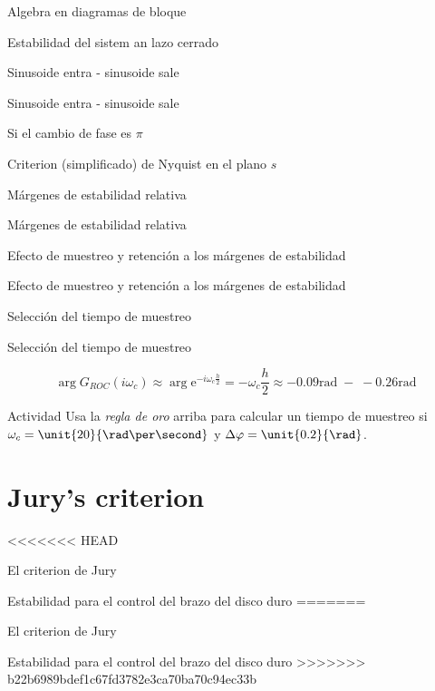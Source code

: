 \documentclass[presentation,aspectratio=169]{beamer}
\begin{document}
\begin{frame}[label={sec:org8e8e439}]{Algebra en diagramas de bloque}
\begin{frame}[label={sec:org5218f19}]{Estabilidad del sistem an lazo cerrado}
\begin{frame}[label={sec:org4ce2307}]{Sinusoide entra - sinusoide sale}
\begin{frame}[label={sec:orgc598966}]{Sinusoide entra - sinusoide sale}
\begin{frame}[label={sec:orgbd54147}]{Si el cambio de fase es \(\pi\)}
\begin{frame}[label={sec:orgf06388b}]{Criterion (simplificado) de Nyquist en el plano \(s\)}
\begin{frame}[label={sec:org5967884}]{Márgenes de estabilidad relativa}
\begin{frame}[label={sec:orgb5ba0e3}]{Márgenes de estabilidad relativa}
\begin{frame}[label={sec:orga8344a9}]{Efecto de muestreo y retención a los márgenes de estabilidad}
\begin{frame}[label={sec:org5e3653d}]{Efecto de muestreo y retención a los márgenes de estabilidad}
\begin{frame}[label={sec:orgd9a9d5d}]{Selección del tiempo de muestreo}
\begin{frame}[label={sec:org8934d24}]{Selección del tiempo de muestreo}
\begin{center}
\end{center}
\[ \arg G_{ROC}(i\omega_c) \approx \arg \mathrm{e}^{-i\omega_c \frac{h}{2}} = -\omega_c \frac{h}{2} \approx -0.09 \text{rad}\; - \; -0.26\text{rad} \]

\alert{Actividad} Usa la \emph{regla de oro} arriba para calcular un tiempo de muestreo si \(\omega_c = \unit{20}{\rad\per\second}\) y \(\Delta\varphi = \unit{0.2}{\rad}\).
\end{frame}

\section{Jury's criterion}
<<<<<<< HEAD
\label{sec:org6e2371e}

\begin{frame}[label={sec:orgf430da5}]{El criterion de Jury}
\end{frame}
\begin{frame}[label={sec:org2cdebfb}]{Estabilidad para el control del brazo del disco duro}
=======
\label{sec:org41b841e}

\begin{frame}[label={sec:orgb2709cb}]{El criterion de Jury}
\end{frame}
\begin{frame}[label={sec:org9fc0e64}]{Estabilidad para el control del brazo del disco duro}
>>>>>>> b22b6989bdef1c67fd3782e3ca70ba70c94ec33b
\begin{center}
\end{center}
\end{frame}
\end{frame}
\end{frame}
\end{frame}
\end{frame}
\end{frame}
\end{frame}
\end{frame}
\end{frame}
\end{frame}
\end{frame}
\end{frame}
\end{frame}
\end{document}

